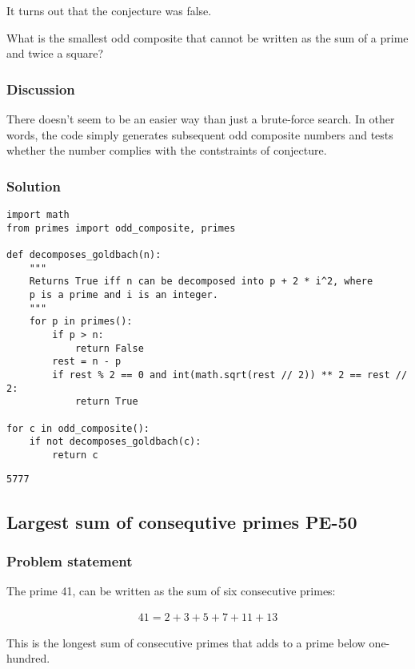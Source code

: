 \documentclass[11pt]{article}
\begin{document}
It turns out that the conjecture was false.

What is the smallest odd composite that cannot be written as the sum of a
prime and twice a square?

\subsubsection{Discussion}
\label{sec:orgheadline7}
There doesn't seem to be an easier way than just a brute-force search.  In
other words, the code simply generates subsequent odd composite numbers and
tests whether the number complies with the contstraints of conjecture.

\subsubsection{Solution}
\label{sec:orgheadline8}
\begin{verbatim}
import math
from primes import odd_composite, primes

def decomposes_goldbach(n):
    """
    Returns True iff n can be decomposed into p + 2 * i^2, where
    p is a prime and i is an integer.
    """
    for p in primes():
        if p > n:
            return False
        rest = n - p
        if rest % 2 == 0 and int(math.sqrt(rest // 2)) ** 2 == rest // 2:
            return True

for c in odd_composite():
    if not decomposes_goldbach(c):
        return c
\end{verbatim}

\begin{verbatim}
5777
\end{verbatim}

\subsection{Largest sum of consequtive primes PE-50}
\label{sec:orgheadline13}
\subsubsection{Problem statement}
\label{sec:orgheadline10}
The prime 41, can be written as the sum of six consecutive primes:

\begin{align*}
  41 = 2 + 3 + 5 + 7 + 11 + 13
\end{align*}

This is the longest sum of consecutive primes that adds to a prime
below one-hundred.
\end{document}
